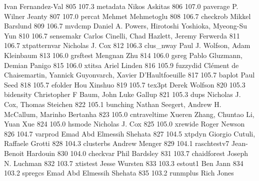                                    Ivan Fernandez-Val                      
   805    107.3    metadata      Nikos Askitas                           
   806    107.0    paverage      P. Wilner Jeanty                        
   807    107.0    percat        Mehmet Mehmetoglu                       
   808    106.7    checkrob      Mikkel Barslund                         
   809    106.7    mvdcmp        Daniel A. Powers, Hirotoshi Yoshioka,   
                                   Myeong-Su Yun                           
   810    106.7    sensemakr     Carlos Cinelli, Chad Hazlett, Jeremy    
                                   Ferwerda                                
   811    106.7    xtpatternvar  Nicholas J. Cox                         
   812    106.3    clus_nway     Paul J. Wolfson, Adam Kleinbaum         
   813    106.0    grsftest      Mengnan Zhu                             
   814    106.0    gsreg         Pablo Gluzmann, Demian Panigo           
   815    106.0    xtitsa        Ariel Linden                            
   816    105.9    fuzzydid      Clément de Chaisemartin, Yannick       
                                   Guyonvarch, Xavier D'Haultfoeuille      
   817    105.7    baplot        Paul Seed                               
   818    105.7    efolder       Hou Xinshuo                             
   819    105.7    tex3pt        Derek Wolfson                           
   820    105.3    bidensity     Christopher F Baum, John Luke Gallup    
   821    105.3    dups          Nicholas J. Cox, Thomas Steichen        
   822    105.1    bunching      Nathan Seegert, Andrew H. McCallum,     
                                   Marinho Bertanha                        
   823    105.0    cntraveltime  Xueren Zhang, Chuntao Li, Yuan Xue      
   824    105.0    hsmode        Nicholas J. Cox                         
   825    105.0    xrewide       Roger Newson                            
   826    104.7    varprod       Emad Abd Elmessih Shehata               
   827    104.5    xtpdyn        Giorgio Cutuli, Raffaele Grotti         
   828    104.3    clusterbs     Andrew Menger                           
   829    104.1    raschtestv7   Jean-Benoit Hardouin                    
   830    104.0    checkvar      Phil Bardsley                           
   831    103.7    chaidforest   Joseph N. Luchman                       
   832    103.7    xtistest      Jesse Wursten                           
   833    103.3    estout1       Ben Jann                                
   834    103.2    spregcs       Emad Abd Elmessih Shehata               
   835    103.2    runmplus      Rich Jones                              
